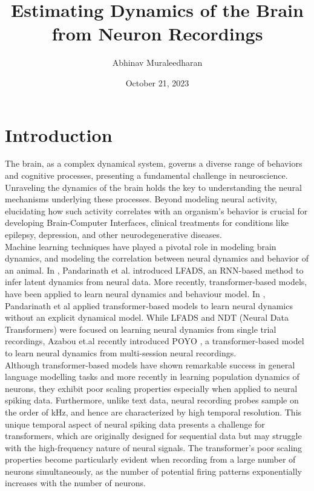 \documentclass[12pt]{article}
\title{Estimating Dynamics of the Brain from Neuron Recordings}
\author{Abhinav Muraleedharan}
\date{October 21, 2023}
\begin{document}
\maketitle

\section{Introduction}

The brain, as a complex dynamical system, governs a diverse range of behaviors and cognitive processes, presenting a fundamental challenge in neuroscience. Unraveling the dynamics of the brain holds the key to understanding the neural mechanisms underlying these processes. Beyond modeling neural activity, elucidating how such activity correlates with an organism's behavior is crucial for developing Brain-Computer Interfaces, clinical treatments for conditions like epilepsy, depression, and other neurodegenerative diseases. \\

Machine learning techniques have played a pivotal role in modeling brain dynamics, and modeling the correlation between neural dynamics and behavior of an animal. In \cite{pandarinath2018inferring}, Pandarinath et al. introduced LFADS, an RNN-based method to infer latent dynamics from neural data.  More recently, transformer-based models\cite{vaswani2017attention, geneva2022transformers}, have been applied to learn neural dynamics and behaviour model. In \cite{ye2021representation}, Pandarinath et al applied transformer-based models to learn neural dynamics without an explicit dynamical model. While LFADS and NDT (Neural Data Transformers) were focused on learning neural dynamics from single trial recordings, Azabou et.al recently introduced POYO \cite{azabou2023unified}, a transformer-based model to learn neural dynamics from multi-session neural recordings.
\\

Although transformer-based models have shown remarkable success in general language modelling tasks and more recently in learning population dynamics of neurons, they exhibit poor scaling properties especially when applied to neural spiking data. Furthermore, unlike text data, neural recording probes sample on the order of kHz, and hence are characterized by high temporal resolution. This unique temporal aspect of neural spiking data presents a challenge for transformers, which are originally designed for sequential data but may struggle with the high-frequency nature of neural signals. The transformer's poor scaling properties become particularly evident when recording from a large number of neurons simultaneously, as the number of potential firing patterns exponentially increases with the number of neurons.
\\
\end{document}
